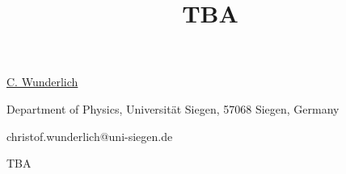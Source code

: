 \title{TBA}

\underline{C. Wunderlich} 

{\normalsize{\vspace{-4mm}
Department of Physics, Universit\"{a}t Siegen, 57068 Siegen, Germany



\email christof.wunderlich@uni-siegen.de}}

TBA

\vspace{\baselineskip} 